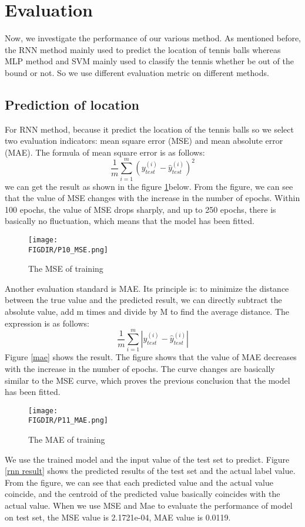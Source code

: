 
\section{Evaluation}
Now, we investigate the performance of our various method. As mentioned before, the RNN method mainly used to predict the location of tennis balls whereas MLP method and SVM mainly used to classify the tennis whether be out of the bound or not. So we use different evaluation metric on different methods.
\subsection{Prediction of location}
For RNN method, because it predict the location of the tennis balls so we select two evaluation indicators: mean square error (MSE) and mean absolute error (MAE). The formula of mean square error is as follows:
\begin{equation}
    \frac{1}{m} \sum_{i=1}^{m} (y_{test}^{(i)}-\hat{y}_{test}^{(i)})^2   
\end{equation}
we can get the result as shown in the figure \ref{MSE}below. From the figure, we can see that the value of MSE changes with the increase in the number of epochs. Within 100 epochs, the value of MSE drops sharply, and up to 250 epochs, there is basically no fluctuation, which means that the model has been fitted.

\begin{figure}[ht]
\centering
\texttt{[image: \\FIGDIR/P10\_MSE.png]}
\caption{The MSE of training}
\label{MSE}
\end{figure}
Another evaluation standard is MAE. Its principle is: to minimize the distance between the true value and the predicted result, we can directly subtract the absolute value, add m times and divide by M to find the average distance. The expression is as follows:
\begin{equation}
 \frac{1}{m} \sum_{i=1}^{m} |y_{test}^{(i)}-\hat{y}_{test}^{(i)}|   
\end{equation}
Figure \ref{mae} shows the result. The figure shows that the value of MAE decreases with the increase in the number of epochs. The curve changes are basically similar to the MSE curve, which proves the previous conclusion that the model has been fitted.

\begin{figure}[ht]
\centering
\texttt{[image: \\FIGDIR/P11\_MAE.png]}
\caption{The MAE of training}
\label{MAE}
\end{figure}
We use the trained model and the input value of the test set to predict. Figure \ref{rnn result}  shows the predicted results of the test set and the actual label value. From the figure, we can see that each predicted value and the actual value coincide, and the centroid of the predicted value basically coincides with the actual value. When we use MSE and Mae to evaluate the performance of model on test set, the MSE value is 2.1721e-04, MAE value is 0.0119.

